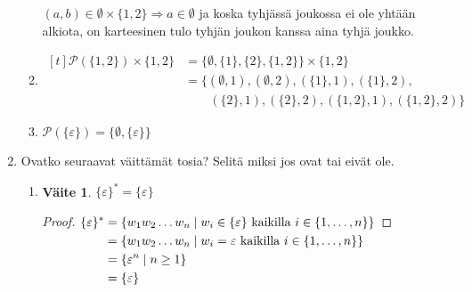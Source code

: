 \documentclass[a4paper,11pt,draft]{article}
\newtheorem*{claim}{Väite}
\begin{document}
\begin{enumerate}
\begin{enumerate}
    $(a,b) \in \emptyset \times \{1,2\} \Rightarrow a \in \emptyset$
    ja koska tyhjässä joukossa ei ole yhtään alkiota, on karteesinen
    tulo tyhjän joukon kanssa aina tyhjä joukko.

  \item
    \begin{math}
      \begin{aligned}[t]
        \mathcal{P}(\{1,2\}) \times \{1,2\}
        &= \{\emptyset, \{1\}, \{2\}, \{1,2\}\} \times \{1,2\} \\
        &= \{(\emptyset, 1), (\emptyset, 2), (\{1\}, 1), (\{1\}, 2),\\
        &\qquad(\{2\}, 1), (\{2\}, 2), (\{1,2\}, 1), (\{1,2\}, 2)\}
      \end{aligned}
    \end{math}

  \item
    $\mathcal{P}(\{\varepsilon\}) = \{\emptyset, \{\varepsilon\}\}$
  \end{enumerate}

\item Ovatko seuraavat väittämät tosia? Selitä miksi jos ovat tai
  eivät ole.
  \begin{enumerate}
  \item
    \begin{claim}
      $\{\varepsilon\}^{*} = \{\varepsilon\}$
    \end{claim}
    \begin{proof}
    \begin{math}
      \begin{aligned}[t]
        \{\varepsilon\}^*
        &= \{w_1w_2 \ldots w_n \mid w_i \in \{\varepsilon\}
           \text{ kaikilla } i \in \{1, \ldots, n\}\}\\
        &= \{w_1w_2 \ldots w_n \mid w_i = \varepsilon
           \text{ kaikilla } i \in \{1, \ldots, n\}\}\\
        &= \{\varepsilon^n \mid n \ge 1\}\\
        &= \{\varepsilon\} \qedhere
      \end{aligned}
    \end{math}
    \end{proof}


\end{enumerate}
\end{enumerate}
\end{document}
